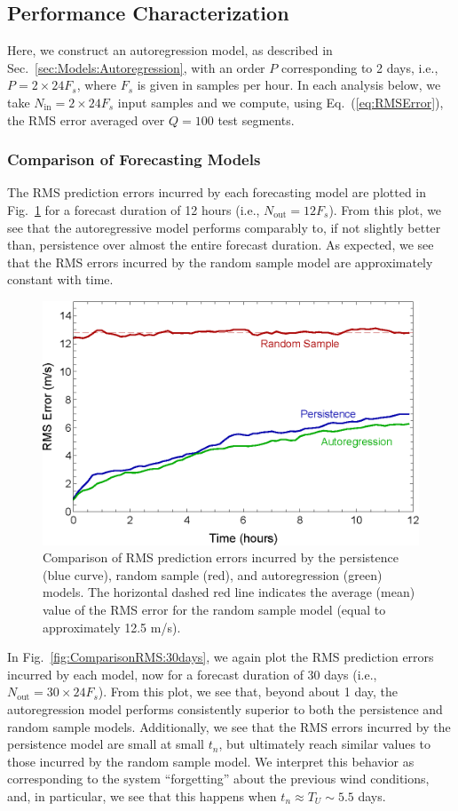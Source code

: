 \documentclass[11pt, oneside]{article}
\newcommand{\figref}[1]{Fig.~\ref{#1}}
\newcommand{\eqnref}[1]{Eq.~(\ref{#1})}
\newcommand{\secref}[1]{Sec.~\ref{#1}}
\begin{document}
\subsection{Performance Characterization}
Here, we construct an autoregression model, as described in \secref{sec:Models:Autoregression}, with an order $P$ corresponding to 2 days, i.e., $P = 2 \times 24 F_s$, where $F_s$ is given in samples per hour.
In each analysis below, we take $N_\text{in} = 2 \times 24 F_s$ input samples and we compute, using \eqnref{eq:RMSError}, the RMS error averaged over $Q = 100$ test segments.

\subsubsection{Comparison of Forecasting Models}\label{sec:Results:Comparison}
The RMS prediction errors incurred by each forecasting model are plotted in \figref{fig:ComparisonRMS:12hrs} for a forecast duration of 12 hours (i.e., $N_\text{out} = 12 F_s$).
From this plot, we see that the autoregressive model performs comparably to, if not slightly better than, persistence over almost the entire forecast duration.
As expected, we see that the RMS errors incurred by the random sample model are approximately constant with time.

\begin{figure}[htb]
\centering
\includegraphics[width=0.7\columnwidth]{figures/ComparisonRMSPredictionError_12hrs}
\caption{Comparison of RMS prediction errors incurred by the persistence (blue curve), random sample (red), and autoregression (green) models.
The horizontal dashed red line indicates the average (mean) value of the RMS error for the random sample model (equal to approximately 12.5 m/s).}
\label{fig:ComparisonRMS:12hrs}
\end{figure}

In \figref{fig:ComparisonRMS:30days}, we again plot the RMS prediction errors incurred by each model, now for a forecast duration of 30 days (i.e., $N_\text{out} = 30 \times 24 F_s$).
From this plot, we see that, beyond about 1 day, the autoregression model performs consistently superior to both the persistence and random sample models.
Additionally, we see that the RMS errors incurred by the persistence model are small at small $t_n$, but ultimately reach similar values to those incurred by the random sample model.
We interpret this behavior as corresponding to the system ``forgetting'' about the previous wind conditions, and, in particular, we see that this happens when $t_n \approx T_U \sim 5.5$ days.
\end{document}
